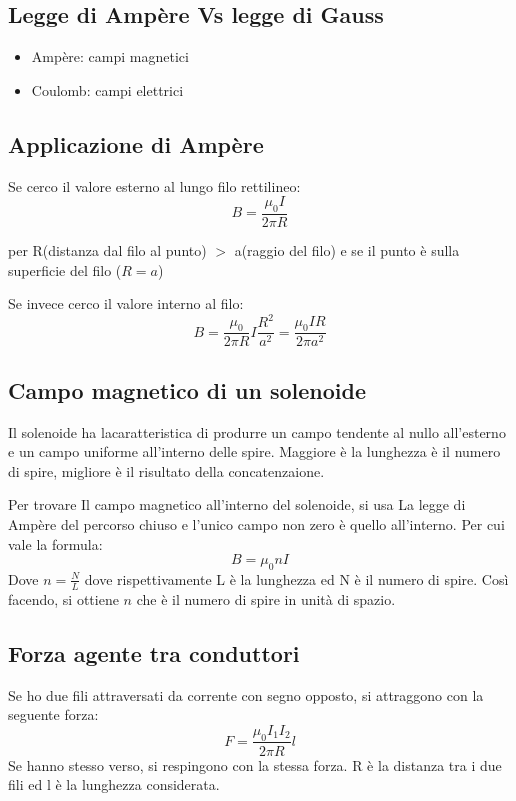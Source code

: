 \subsection{Legge di Ampère Vs legge di Gauss}
\begin{itemize}
    \item Ampère: campi magnetici
    \item Coulomb: campi elettrici
\end{itemize}

\subsection{Applicazione di Ampère}
Se cerco il valore esterno al lungo filo rettilineo:
\begin{equation}
    B = \frac{\mu_0I}{2\pi R}
\end{equation}

per R(distanza dal filo al punto) $>$ a(raggio del filo) e 
se il punto è sulla superficie del filo ($R=a$)

Se invece cerco il valore interno al filo:
\begin{equation}
    B = \frac{\mu_0}{2\pi R}I\frac{R^2}{a^2} = \frac{\mu_0IR}{2\pi a^2}
\end{equation}

\subsection{Campo magnetico di un solenoide}
Il solenoide ha lacaratteristica di produrre un campo tendente al nullo
all'esterno e un campo uniforme all'interno delle spire.
Maggiore è la lunghezza è il numero di spire, migliore è il risultato della 
concatenzaione.

Per trovare Il campo magnetico all'interno del solenoide, si usa La
legge di Ampère del percorso chiuso e l'unico campo non zero è quello all'interno.
Per cui vale la formula:
\begin{equation}
    B = \mu_0nI
\end{equation}
Dove $n=\frac{N}{L}$ dove rispettivamente L è la lunghezza ed N è il numero di spire.
Così facendo, si ottiene $n$ che è il numero di spire in unità di spazio.


\subsection{Forza agente tra conduttori}
Se ho due fili attraversati da corrente con segno opposto, si attraggono 
con la seguente forza:
\begin{equation}
    F = \frac{\mu_0I_1I_2}{2\pi R}l
\end{equation}
Se hanno stesso verso, si respingono con la stessa forza.
R è la distanza tra i due fili ed l è la lunghezza considerata.

